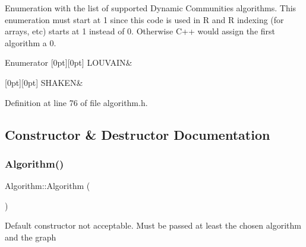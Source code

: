 Enumeration with the list of supported Dynamic Communities algorithms. This enumeration must start at 1 since this code is used in R and R indexing (for arrays, etc) starts at 1 instead of 0. Otherwise C++ would assign the first algorithm a 0. \begin{DoxyEnumFields}{Enumerator}
[0pt][0pt]{}\mbox{\label{classAlgorithm_a38e19a8c3dc51b97563a34d9e59a748dab77e66715d6be972cdbf6cc4d990e732}} 
L\+O\+U\+V\+A\+IN&\\
\hline

[0pt][0pt]{}\mbox{\label{classAlgorithm_a38e19a8c3dc51b97563a34d9e59a748da1081b2130037a7b464f64d6cc82b3100}} 
S\+H\+A\+K\+EN&\\
\hline

\end{DoxyEnumFields}


Definition at line 76 of file algorithm.\+h.



\subsection{Constructor \& Destructor Documentation}
\mbox{\label{classAlgorithm_adb63a5f03ed70abb7e355631799c1ad0}} 
\subsubsection{\texorpdfstring{Algorithm()}{Algorithm()}\hspace{0.1cm}{\footnotesize\ttfamily [1/2]}}
{\footnotesize\ttfamily Algorithm\+::\+Algorithm (\begin{DoxyParamCaption}{ }\end{DoxyParamCaption})\hspace{0.3cm}{\ttfamily [delete]}}

Default constructor not acceptable. Must be passed at least the chosen algorithm and the graph 

